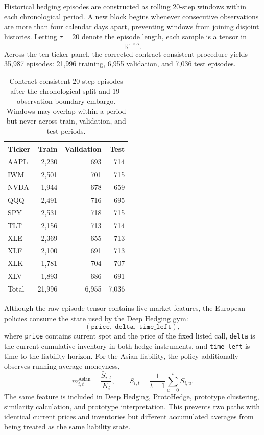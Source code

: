 \documentclass[sigconf]{acmart}
\begin{document}
Historical hedging episodes are constructed as rolling 20-step windows within
each chronological period. A new block begins whenever consecutive
observations are more than four calendar days apart, preventing windows from
joining disjoint histories. Letting $\tau=20$ denote the episode length, each
sample is a tensor in
\[
\mathbb{R}^{\tau \times 5}.
\]
Across the ten-ticker panel, the corrected contract-consistent procedure yields
35{,}987 episodes: 21{,}996 training, 6{,}955 validation, and 7{,}036 test
episodes.

\begin{table}[t]
\centering
\small
\begin{tabular}{lrrr}
\toprule
Ticker & Train & Validation & Test \\
\midrule
AAPL & 2,230 & 693 & 714 \\
IWM  & 2,501 & 701 & 715 \\
NVDA & 1,944 & 678 & 659 \\
QQQ  & 2,491 & 716 & 695 \\
SPY  & 2,531 & 718 & 715 \\
TLT  & 2,156 & 713 & 714 \\
XLE  & 2,369 & 655 & 713 \\
XLF  & 2,100 & 691 & 713 \\
XLK  & 1,781 & 704 & 707 \\
XLV  & 1,893 & 686 & 691 \\
\midrule
Total & 21,996 & 6,955 & 7,036 \\
\bottomrule
\end{tabular}
\caption{Contract-consistent 20-step episodes after the chronological split
and 19-observation boundary embargo. Windows may overlap within a period but
never across train, validation, and test periods.}
\label{tab:panel-counts}
\end{table}

Although the raw episode tensor contains five market features, the European
policies consume the state used by the Deep Hedging gym:
\[
(\texttt{price},\; \texttt{delta},\; \texttt{time\_left}),
\]
where \texttt{price} contains current spot and the price of the fixed listed
call, \texttt{delta} is the current cumulative inventory in both hedge
instruments, and \texttt{time\_left} is time to the liability horizon. For the
Asian liability, the policy additionally observes running-average moneyness,
\[
m^{\mathrm{Asian}}_{i,t}
=
\frac{\bar S_{i,t}}{K_i},
\qquad
\bar S_{i,t}=\frac{1}{t+1}\sum_{u=0}^{t}S_{i,u}.
\]
The same feature is included in Deep Hedging, ProtoHedge, prototype
clustering, similarity calculation, and prototype interpretation. This
prevents two paths with identical current prices and inventories but different
accumulated averages from being treated as the same liability state.
\end{document}
